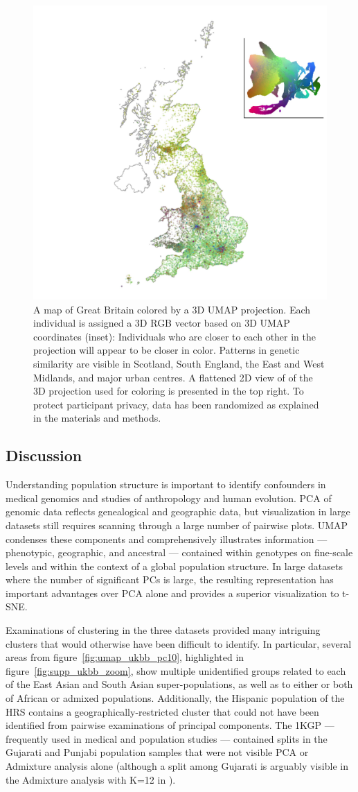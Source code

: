 \documentclass[12pt]{pnas-new}
\begin{document}
\begin{figure}
    \centering
    \includegraphics[width=0.5\columnwidth]{images/UKBB_mapsInMaps_2D3_permute50.jpg}
    \caption{A map of Great Britain colored by a 3D UMAP projection. Each individual is assigned a 3D RGB vector based on 3D UMAP coordinates (inset): Individuals who are closer to each other in the projection will appear to be closer in color. Patterns in genetic similarity are visible in Scotland, South England, the East and West Midlands, and major urban centres. A flattened 2D view of of the 3D projection used for coloring is presented in the top right. To protect participant privacy, data has been randomized as explained in the materials and methods.}
    \label{fig:umap_ukbb_geo_map}
\end{figure}

\subsection*{Discussion}
Understanding population structure is important to identify confounders in medical genomics and studies of anthropology and human evolution. PCA of genomic data reflects genealogical and geographic data, but visualization in large datasets still requires scanning through a large number of pairwise plots. UMAP condenses these components and comprehensively illustrates information --- phenotypic, geographic, and ancestral --- contained within genotypes on fine-scale levels and within the context of a global population structure. In large datasets where the number of significant PCs is large, the resulting representation has important advantages over
PCA alone and provides a superior visualization to t-SNE.

Examinations of clustering in the three datasets provided many intriguing clusters that would otherwise have been difficult to identify. In particular, several areas from figure~\ref{fig:umap_ukbb_pc10}, highlighted in figure~\ref{fig:supp_ukbb_zoom}, show multiple unidentified groups related to each of the East Asian and South Asian super-populations, as well as to either or both of African or admixed populations. Additionally, the Hispanic population of the HRS contains a geographically-restricted cluster that could not have been identified from pairwise examinations of principal components. The 1KGP --- frequently used in medical and population studies --- contained splits in the Gujarati and Punjabi population samples that were not visible PCA or Admixture analysis alone (although a split among Gujarati is arguably visible in the Admixture analysis with K=12 in \cite{10002015global}). 
\end{document}
